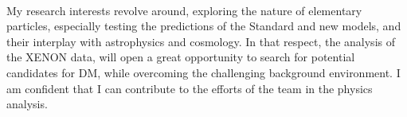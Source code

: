 \documentclass[a4paper]{article}
\begin{document}
\newpage
~\par My research interests revolve around, exploring the nature of elementary particles, especially testing the predictions of the Standard and new models, and their interplay with astrophysics and cosmology. In that respect, the analysis of the XENON data, will open a great opportunity to search for potential candidates for DM, while overcoming the challenging background environment. I am confident that I can contribute to the efforts of the team in the physics analysis.
\end{document}
